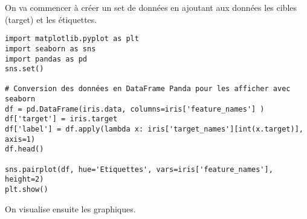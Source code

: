 On va commencer à créer un set de données en ajoutant aux données les cibles (target) et les étiquettes. 
\begin{verbatim}
import matplotlib.pyplot as plt
import seaborn as sns
import pandas as pd
sns.set()

# Conversion des données en DataFrame Panda pour les afficher avec seaborn
df = pd.DataFrame(iris.data, columns=iris['feature_names'] )
df['target'] = iris.target
df['label'] = df.apply(lambda x: iris['target_names'][int(x.target)], axis=1)
df.head()

sns.pairplot(df, hue='Etiquettes', vars=iris['feature_names'], height=2)
plt.show()
\end{verbatim}

On visualise ensuite les graphiques.

